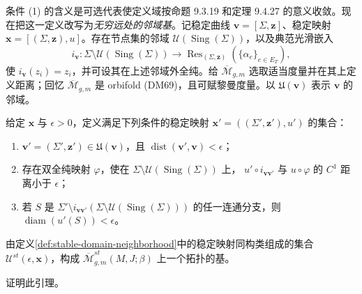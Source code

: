 条件 (1) 的含义是可选代表使定义域按命题 9.3.19 和定理 9.4.27 的意义收敛。现在把这一定义改写为\emph{无穷远处的邻域基}。记稳定曲线
$\mathbf v=[\Sigma,\boldsymbol z]$、稳定映射
$\mathbf x=[(\Sigma,\boldsymbol z),u]$。存在节点集的邻域
$\mathcal U(\operatorname{Sing}(\Sigma))$，以及典范光滑嵌入
\begin{equation}
 i_{\mathbf v}:\Sigma\setminus\mathcal U(\operatorname{Sing}(\Sigma))
 \longrightarrow\operatorname{Res}_{(\Sigma,\boldsymbol z)}
 (\{\alpha_e\}_{e\in E_T}),
 \label{eq:canonical-embedding-resolved-domain}
\end{equation}
使 $i_{\mathbf v}(z_i)=z_i$，并可设其在上述邻域外全纯。给
$\overline{\mathcal M}_{g,m}$ 选取适当度量并在其上定义距离；回忆
$\overline{\mathcal M}_{g,m}$ 是 orbifold (DM69)，且可赋黎曼度量。以
$\mathfrak U(\mathbf v)$ 表示 $\mathbf v$ 的邻域。

\begin{definition}\label{def:stable-domain-neighborhood}
给定 $\mathbf x$ 与 $\epsilon>0$，定义满足下列条件的稳定映射
$\mathbf x'=((\Sigma',\boldsymbol z'),u')$ 的集合：
\begin{enumerate}[label=(\arabic*)]
 \item $\mathbf v'=(\Sigma',\boldsymbol z')\in\mathfrak U(\mathbf v)$，且
 $\operatorname{dist}(\mathbf v',\mathbf v)<\epsilon$；
 \item 存在双全纯映射 $\varphi$，使在
 $\Sigma\setminus\mathcal U(\operatorname{Sing}(\Sigma))$ 上，
 $u'\circ i_{\mathbf v\mathbf v'}$ 与 $u\circ\varphi$ 的 $C^1$ 距离小于 $\epsilon$；
 \item 若 $S$ 是
 $\Sigma'\setminus i_{\mathbf v\mathbf v'}(\Sigma\setminus
 \mathcal U(\operatorname{Sing}(\Sigma)))$ 的任一连通分支，则
 $\operatorname{diam}(u'(S))<\epsilon$。
\end{enumerate}
\end{definition}

\begin{lemma}\label{lem:stable-domain-topology-basis}
由定义\ref{def:stable-domain-neighborhood}中的稳定映射同构类组成的集合
$\mathcal U^{st}(\epsilon,\mathbf x)$，构成
$\overline{\mathcal M}_{g,m}^{st}(M,J;\beta)$ 上一个拓扑的基。
\end{lemma}

\begin{exercise}\label{ex:stable-domain-topology-basis}
证明此引理。
\end{exercise}

